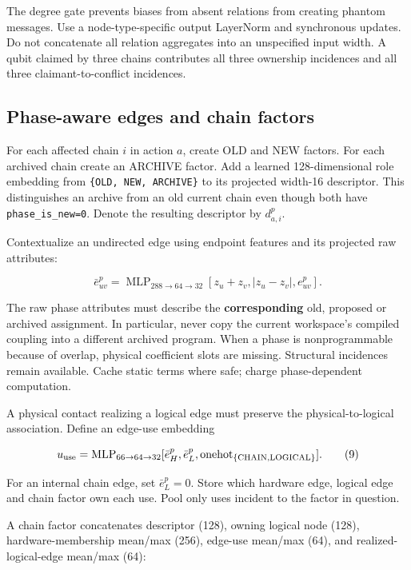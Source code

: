 \documentclass[10pt,a4paper]{article}
\begin{document}
The degree gate prevents biases from absent relations from creating
phantom messages. Use a node-type-specific output LayerNorm and
synchronous updates. Do not concatenate all relation aggregates into an
unspecified input width. A qubit claimed by three chains contributes all
three ownership incidences and all three claimant-to-conflict
incidences.

\hypertarget{phase-aware-edges-and-chain-factors}{%
\subsection{Phase-aware edges and chain
factors}\label{phase-aware-edges-and-chain-factors}}

For each affected chain \(i\) in action \(a\), create OLD and NEW
factors. For each archived chain create an ARCHIVE factor. Add a learned
128-dimensional role embedding from \texttt{\{OLD,\ NEW,\ ARCHIVE\}} to
its projected width-16 descriptor. This distinguishes an archive from an
old current chain even though both have \texttt{phase\_is\_new=0}.
Denote the resulting descriptor by \(d_{a,i}^{p}\).

Contextualize an undirected edge using endpoint features and its
projected raw attributes:

\[
\bar e_{uv}^{p}=\operatorname{MLP}_{288\to64\to32}
[z_u+z_v,|z_u-z_v|,e_{uv}^{p}].
\tag{8}
\]

The raw phase attributes must describe the \textbf{corresponding} old,
proposed or archived assignment. In particular, never copy the current
workspace's compiled coupling into a different archived program. When a
phase is nonprogrammable because of overlap, physical coefficient slots
are missing. Structural incidences remain available. Cache static terms
where safe; charge phase-dependent computation.

A physical contact realizing a logical edge must preserve the
physical-to-logical association. Define an edge-use embedding

\[
u_{\rm use}=\operatorname{MLP}_{66\to64\to32}
[\bar e_H^{p},\bar e_L^{p},\operatorname{onehot}_{\{\mathrm{CHAIN},\mathrm{LOGICAL}\}}].
\tag{9}
\]

For an internal chain edge, set \(\bar e_L^p=0\). Store which hardware
edge, logical edge and chain factor own each use. Pool only uses
incident to the factor in question.

A chain factor concatenates descriptor (128), owning logical node (128),
hardware-membership mean/max (256), edge-use mean/max (64), and
realized-logical-edge mean/max (64):
\end{document}
